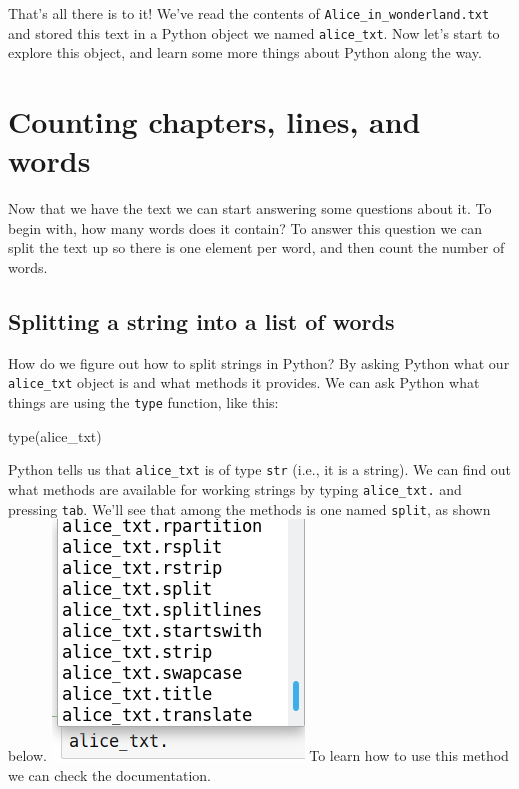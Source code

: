 \documentclass[]{book}
\newenvironment{Shaded}{\begin{snugshade}}{\end{snugshade}}
\newcommand{\BuiltInTok}[1]{#1}
\newcommand{\NormalTok}[1]{#1}
\begin{document}
That's all there is to it! We've read the contents of
\texttt{Alice\_in\_wonderland.txt} and stored this text in a Python
object we named \texttt{alice\_txt}. Now let's start to explore this
object, and learn some more things about Python along the way.

\section{Counting chapters, lines, and
words}\label{counting-chapters-lines-and-words}

Now that we have the text we can start answering some questions about
it. To begin with, how many words does it contain? To answer this
question we can split the text up so there is one element per word, and
then count the number of words.

\subsection{Splitting a string into a list of
words}\label{splitting-a-string-into-a-list-of-words}

How do we figure out how to split strings in Python? By asking Python
what our \texttt{alice\_txt} object is and what methods it provides. We
can ask Python what things are using the \texttt{type} function, like
this:

\begin{Shaded}
\begin{Highlighting}[]
\BuiltInTok{type}\NormalTok{(alice_txt)}
\end{Highlighting}
\end{Shaded}

Python tells us that \texttt{alice\_txt} is of type \texttt{str} (i.e.,
it is a string). We can find out what methods are available for working
strings by typing \texttt{alice\_txt.} and pressing \texttt{tab}. We'll
see that among the methods is one named \texttt{split}, as shown below.
\includegraphics{Python/PythonIntro/images/notebook_string_completion.png}
To learn how to use this method we can check the documentation.
\end{document}

